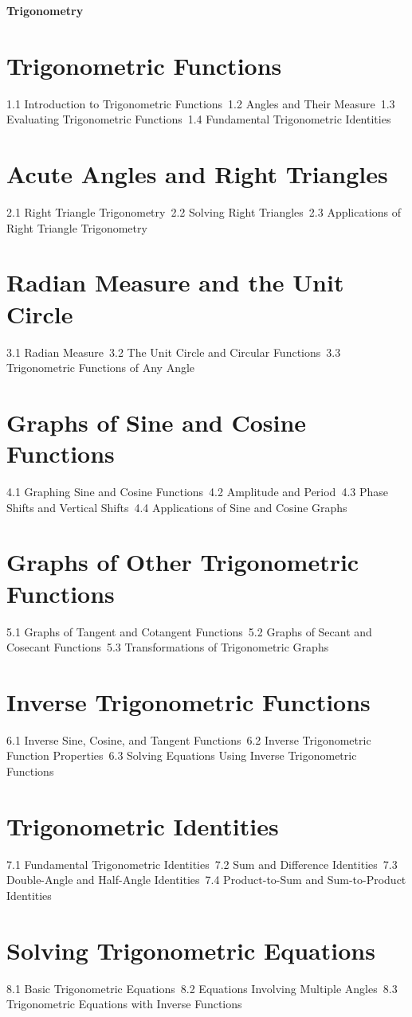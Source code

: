 {\LARGE \bf{Trigonometry}}
\section{Trigonometric Functions}
1.1 Introduction to Trigonometric Functions\
1.2 Angles and Their Measure\
1.3 Evaluating Trigonometric Functions\
1.4 Fundamental Trigonometric Identities\
\section{Acute Angles and Right Triangles}
2.1 Right Triangle Trigonometry\
2.2 Solving Right Triangles\
2.3 Applications of Right Triangle Trigonometry\
\section{Radian Measure and the Unit Circle}
3.1 Radian Measure\
3.2 The Unit Circle and Circular Functions\
3.3 Trigonometric Functions of Any Angle\
\section{Graphs of Sine and Cosine Functions}
4.1 Graphing Sine and Cosine Functions\
4.2 Amplitude and Period\
4.3 Phase Shifts and Vertical Shifts\
4.4 Applications of Sine and Cosine Graphs\
\section{Graphs of Other Trigonometric Functions}
5.1 Graphs of Tangent and Cotangent Functions\
5.2 Graphs of Secant and Cosecant Functions\
5.3 Transformations of Trigonometric Graphs\
\section{Inverse Trigonometric Functions}
6.1 Inverse Sine, Cosine, and Tangent Functions\
6.2 Inverse Trigonometric Function Properties\
6.3 Solving Equations Using Inverse Trigonometric Functions\
\section{Trigonometric Identities}
7.1 Fundamental Trigonometric Identities\
7.2 Sum and Difference Identities\
7.3 Double-Angle and Half-Angle Identities\
7.4 Product-to-Sum and Sum-to-Product Identities\
\section{Solving Trigonometric Equations}
8.1 Basic Trigonometric Equations\
8.2 Equations Involving Multiple Angles\
8.3 Trigonometric Equations with Inverse Functions\
